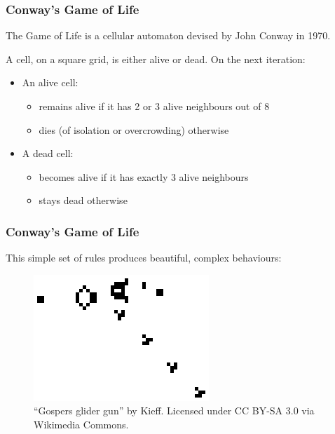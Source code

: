 \subsubsection{Conway's Game of Life}\label{conways-game-of-life}

The Game of Life is a cellular automaton devised by John Conway in 1970.

A cell, on a square grid, is either alive or dead. On the next
iteration:

\begin{itemize}
\itemsep1pt\parskip0pt
\item
  An alive cell:

  \begin{itemize}
  \itemsep1pt\parskip0pt
  \item
    remains alive if it has 2 or 3 alive neighbours out of 8
  \item
    dies (of isolation or overcrowding) otherwise
  \end{itemize}
\item
  A dead cell:

  \begin{itemize}
  \itemsep1pt\parskip0pt
  \item
    becomes alive if it has exactly 3 alive neighbours
  \item
    stays dead otherwise
  \end{itemize}
\end{itemize}

\subsubsection{Conway's Game of Life}\label{conways-game-of-life-1}

This simple set of rules produces beautiful, complex behaviours:

\begin{figure}[htbp]
\centering
\includegraphics{93MPIExample/figures/gun.png}
\caption{``Gospers glider gun'' by Kieff. Licensed under CC BY-SA 3.0
via Wikimedia Commons.}
\end{figure}

